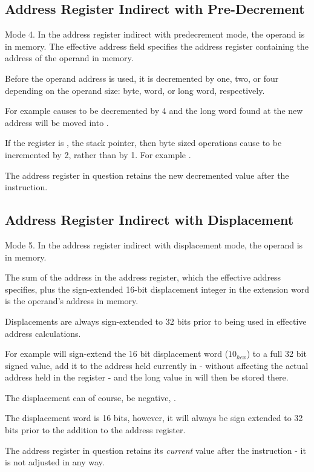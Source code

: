 \subsection{Address Register Indirect with Pre-Decrement}
Mode 4. In the address register indirect with predecrement mode, the operand is in memory. The effective address field specifies the address register containing the address of the operand in memory. 

Before the operand address is used, it is decremented by one, two, or four depending on the operand size: byte, word, or long word, respectively. 

For example  causes  to be decremented by 4 and the long word found at the new address will be moved into .

If the register is , the stack pointer, then byte sized operations cause  to be incremented by 2, rather than by 1. For example .

The address register in question retains the new decremented value after the instruction.

\subsection{Address Register Indirect with Displacement}
Mode 5. In the address register indirect with displacement mode, the operand is in memory. 

The sum of the address in the address register, which the effective address specifies, plus the sign-extended 16-bit displacement integer in the extension word is the operand’s address in memory. 

Displacements are always sign-extended to 32 bits prior to being used in effective address calculations.

For example  will sign-extend the 16 bit displacement word ($10_{hex}$) to a full 32 bit signed value, add it to the address held currently in  - without affecting the actual address held in the register - and the long value in  will then be stored there.

The displacement can of course, be negative, .

The displacement word is 16 bits, however, it will always be sign extended to 32 bits prior to the addition to the address register.

The address register in question retains its \emph{current} value after the instruction - it is not adjusted in any way.


